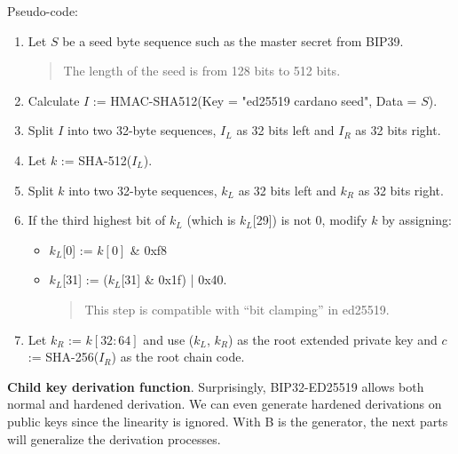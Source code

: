Pseudo-code:
\begin{enumerate}
    \item Let $S$ be a seed byte sequence such as the master secret from BIP39.
          \begin{quote}
              The length of the seed is from 128 bits to 512 bits.
          \end{quote}
          \bigskip

    \item Calculate $I$ := HMAC-SHA512(Key = "ed25519 cardano seed", Data = $S$).
          \bigskip
    \item Split $I$ into two 32-byte sequences, $I_L$ as 32 bits left and $I_R$ as 32 bits right.
          \bigskip

    \item Let $k$ := SHA-512($I_L$).
          \bigskip
    \item Split $k$ into two 32-byte sequences, $k_L$ as 32 bits left and $k_R$ as 32 bits right.
          \bigskip
    \item If the third highest bit of $k_L$ (which is $k_L$[29]) is not 0, modify $k$ by assigning:
          \begin{itemize}
              \item $k_L$[0] := $k[0]$ \& 0xf8
              \item $k_L$[31] := ($k_L$[31] \& 0x1f) | 0x40.
                    \begin{quote}
                        This step is compatible with “bit clamping” in ed25519.
                    \end{quote}
          \end{itemize}
          \bigskip
    \item Let $k_R$ := $k[32:64]$ and use ($k_L$, $k_R$) as the root extended private key and $c$ := SHA-256($I_R$) as the root chain code.
\end{enumerate}

\bigskip
{\textbf{Child key derivation function}}. Surprisingly, BIP32-ED25519 allows both normal and hardened derivation. We can even generate hardened derivations on public keys since the linearity is ignored. With B is the generator, the next parts will generalize the derivation processes.


